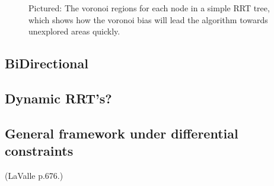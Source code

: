 \begin{figure}
  \caption{Pictured: The voronoi regions for each node in a simple RRT tree,
    which shows how the voronoi bias will lead the algorithm towards unexplored
    areas quickly.}
  \label{fig:rrt-voronoi}
\end{figure}

\subsection{BiDirectional}
\subsection{Dynamic RRT's?}

\begin{figure}
  
\end{figure}

\subsection{General framework under differential constraints} (LaValle p.676.)


